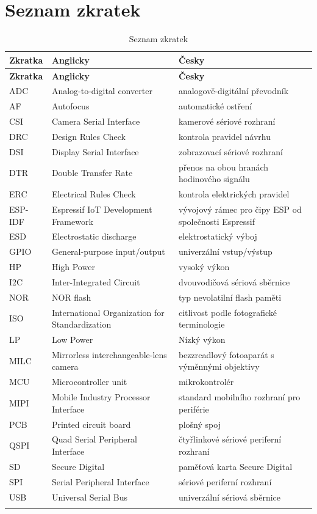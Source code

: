 \documentclass[12pt, a4paper, oneside]{report}
\begin{document}
\chapter*{Seznam zkratek}
\begingroup
\setlength{\tabcolsep}{6pt}
\renewcommand{\arraystretch}{1.4}
\begin{longtable}{>{\raggedright\arraybackslash}p{2.6cm} >{\raggedright\arraybackslash}p{6.3cm} >{\raggedright\arraybackslash}p{5.2cm}}

\textbf{Zkratka} & \textbf{Anglicky} & \textbf{Česky} \\
\endfirsthead
\textbf{Zkratka} & \textbf{Anglicky} & \textbf{Česky} \\
\endhead
ADC & Analog-to-digital converter & analogově-digitální převodník \\
AF & Autofocus & automatické ostření \\
CSI & Camera Serial Interface & kamerové sériové rozhraní \\
DRC & Design Rules Check & kontrola pravidel návrhu \\
DSI & Display Serial Interface & zobrazovací sériové rozhraní \\
DTR & Double Transfer Rate & přenos na obou hranách hodinového signálu \\
ERC & Electrical Rules Check & kontrola elektrických pravidel \\
ESP-IDF & Espressif IoT Development Framework & vývojový rámec pro čipy ESP od společnosti Espressif \\
ESD & Electrostatic discharge & elektrostatický výboj \\
GPIO & General-purpose input/output & univerzální vstup/výstup \\
HP & High Power & vysoký výkon\\
I2C & Inter-Integrated Circuit & dvouvodičová sériová sběrnice \\
NOR & NOR flash & typ nevolatilní flash paměti \\
ISO & International Organization for Standardization & citlivost podle fotografické terminologie \\
LP & Low Power & Nízký výkon\\
MILC & Mirrorless interchangeable-lens camera & bezzrcadlový fotoaparát s výměnnými objektivy \\
MCU & Microcontroller unit & mikrokontrolér \\
MIPI & Mobile Industry Processor Interface & standard mobilního rozhraní pro periférie \\
PCB & Printed circuit board & plošný spoj \\
QSPI & Quad Serial Peripheral Interface & čtyřlinkové sériové periferní rozhraní \\
SD & Secure Digital & paměťová karta Secure Digital \\
SPI & Serial Peripheral Interface & sériové periferní rozhraní \\
USB & Universal Serial Bus & univerzální sériová sběrnice \\
\caption{Seznam zkratek}
\end{longtable}
\endgroup
\end{document}
